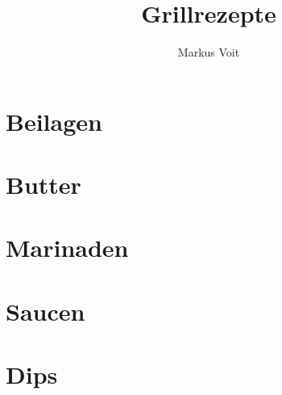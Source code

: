 \documentclass[
  DIV=11,%
  pagesize,%
  fontsize=11pt,%
  paper=a4,%
  numbers=noenddot,
]{scrartcl}
\title{Grillrezepte}
\author{Markus Voit}
\begin{document}
\maketitle

\tableofcontents
\clearpage

\section{Beilagen}
\newpage{}
\newpage{}
\newpage{}

\section{Butter}
\newpage{}
\newpage{}
\newpage{}
\newpage{}
\newpage{}

\section{Marinaden}
\newpage{}
\newpage{}
\newpage{}

\section{Saucen}
\newpage{}
\newpage{}
\newpage{}
\newpage{}
\newpage{}
\newpage{}
\newpage{}

\section{Dips}
\newpage{}
\end{document}
